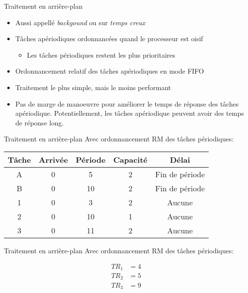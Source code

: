 \begin{frame}{Traitement en arrière-plan} 
  \begin{itemize}
  \item Aussi appellé \emph{backgound} ou sur \emph{temps creux}
  \item Tâches apériodiques ordonnancées quand le processeur est oisif 
    \begin{itemize}
    \item Les tâches périodiques restent les plus prioritaires 
    \end{itemize}
  \item Ordonnancement relatif des tâches apériodiques en mode FIFO 
  \item Traitement le plus simple, mais le moins performant 
  \item Pas de  marge de manoeuvre pour améliorer  le temps de réponse
    des  tâches apériodique.  Potentiellement, les  tâches apériodique
    peuvent avoir des temps de réponse long.
  \end{itemize}
\end{frame}

\begin{frame}{Traitement en arrière-plan} 
  Avec ordonnancement RM des tâches périodiques:
  \begin{center}
    \begin{tabular}{ccccc}
      \hline
      Tâche & Arrivée & Période & Capacité & Délai \\
      \hline
      A & 0 &  5 & 2 & Fin de période\\
      B & 0 & 10 & 2 & Fin de période\\
      1 & 0 &  3 & 2 & Aucune\\
      2 & 0 & 10 & 1 & Aucune\\
      3 & 0 & 11 & 2 & Aucune\\
      \hline
    \end{tabular}
    \pause
    
  \end{center}
\end{frame} 

\begin{frame}{Traitement en arrière-plan} 
  Avec ordonnancement RM des tâches périodiques:
  \begin{center}
    
    \begin{align*}
      TR_1 &= 4\\
      TR_2 &= 5\\
      TR_3 &= 9\\
    \end{align*}
  \end{center}
\end{frame} 

